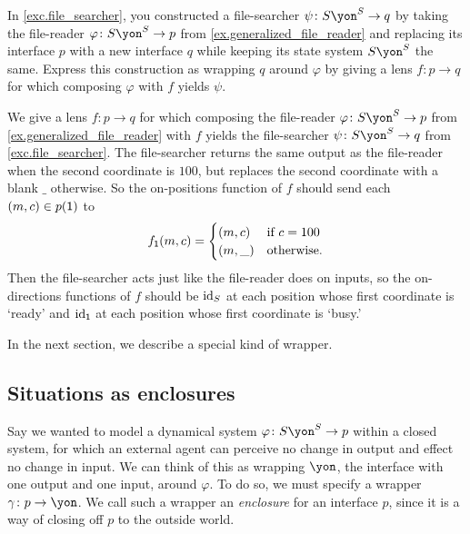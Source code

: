 \documentclass[Book-Poly]{subfiles}
\begin{document}
\begin{exercise} \label{exc.file_searcher_wrap}
In \cref{exc.file_searcher}, you constructed a file-searcher $\psi\colon S\yon^S\to q$ by taking the file-reader $\varphi\colon S\yon^S\to p$ from \cref{ex.generalized_file_reader} and replacing its interface $p$ with a new interface $q$ while keeping its state system $S\yon^S$ the same.
Express this construction as wrapping $q$ around $\varphi$ by giving a lens $f\colon p\to q$ for which composing $\varphi$ with $f$ yields $\psi$.
\begin{solution}
We give a lens $f\colon p\to q$ for which composing the file-reader $\varphi\colon S\yon^S\to p$ from \cref{ex.generalized_file_reader} with $f$ yields the file-searcher $\psi\colon S\yon^S\to q$ from \cref{exc.file_searcher}.
The file-searcher returns the same output as the file-reader when the second coordinate is $100$, but replaces the second coordinate with a blank $\_$ otherwise.
So the on-positions function of $f$ should send each $(m,c)\in p(\textsf{1})$ to
\[
    f_{\textsf{1}}(m,c) = 
        \begin{cases}
            (m,c) & \text{if } c = 100 \\
            (m,\_) & \text{otherwise}.
        \end{cases}
\]
Then the file-searcher acts just like the file-reader does on inputs, so the on-directions functions of $f$ should be $\mathrm{id}_S$ at each position whose first coordinate is `ready' and $\mathrm{id}_{\textsf{1}}$ at each position whose first coordinate is `busy.'
\end{solution}
\end{exercise}

In the next section, we describe a special kind of wrapper.

\subsection{Situations as enclosures}\label{subsec.poly.dyn_sys.new.sit_encl}
Say we wanted to model a dynamical system $\varphi\colon S\yon^S\to p$ within a closed system, for which an external agent can perceive no change in output and effect no change in input.
We can think of this as wrapping $\yon$, the interface with one output and one input, around $\varphi$.
To do so, we must specify a wrapper $\gamma\colon p\to\yon$.
We call such a wrapper an \emph{enclosure} for an interface $p$, since it is a way of closing off $p$ to the outside world.
\end{document}
